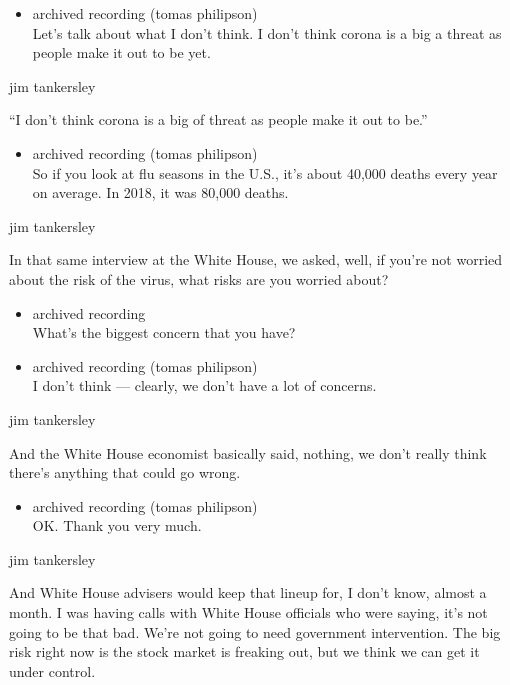 \begin{itemize}
\tightlist
\item
  archived recording (tomas philipson)\\
  Let's talk about what I don't think. I don't think corona is a big a
  threat as people make it out to be yet.
\end{itemize}

jim tankersley

``I don't think corona is a big of threat as people make it out to be.''

\begin{itemize}
\tightlist
\item
  archived recording (tomas philipson)\\
  So if you look at flu seasons in the U.S., it's about 40,000 deaths
  every year on average. In 2018, it was 80,000 deaths.
\end{itemize}

jim tankersley

In that same interview at the White House, we asked, well, if you're not
worried about the risk of the virus, what risks are you worried about?

\begin{itemize}
\item
  archived recording\\
  What's the biggest concern that you have?
\item
  archived recording (tomas philipson)\\
  I don't think --- clearly, we don't have a lot of concerns.
\end{itemize}

jim tankersley

And the White House economist basically said, nothing, we don't really
think there's anything that could go wrong.

\begin{itemize}
\tightlist
\item
  archived recording (tomas philipson)\\
  OK. Thank you very much.
\end{itemize}

jim tankersley

And White House advisers would keep that lineup for, I don't know,
almost a month. I was having calls with White House officials who were
saying, it's not going to be that bad. We're not going to need
government intervention. The big risk right now is the stock market is
freaking out, but we think we can get it under control.

